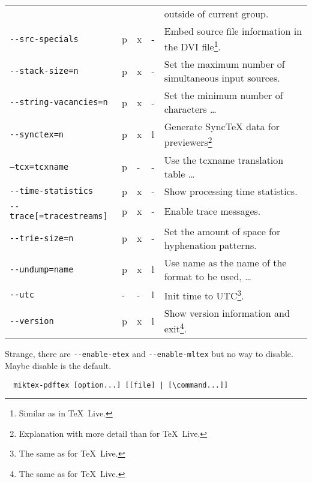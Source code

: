 \documentclass[a4paper, english]{article}%
\newcommand{\pdflatex}{\texttt{pdflatex}}
\newcommand{\texlive}{\TeX~Live}
\begin{document}
{\begin{longtable}{|lllll|}
                                      &  & &        & outside of current group. \\
\texttt{-{}-src-specials}             & p&x&- & Embed source file information in the DVI file\footnote%
{Similar as in \texlive. }. \\
\texttt{-{}-stack-size=n}             & p&x&- & Set the maximum number of simultaneous input sources. \\
\texttt{-{}-string-vacancies=n}       & p&x&- & Set the minimum number of characters \dots \\
\texttt{-{}-synctex=n}                & p&x&l       & Generate SyncTeX data for previewers\footnote%
{Explanation with more detail than for \texlive. } \\
\texttt{--tcx=tcxname}                & p&-&- & Use the tcxname translation table \dots \\
\texttt{-{}-time-statistics}          & p&x&- & Show processing time statistics. \\
\texttt{-{}-trace[=tracestreams]}     & p&x&- & Enable trace messages. \\
\texttt{-{}-trie-size=n}              & p&x&- & Set the amount of space for hyphenation patterns. \\
\texttt{-{}-undump=name}              & p&x&l       & Use name as the name of the format to be used, \dots \\
\texttt{-{}-utc}                      & -&-&l & Init time to UTC\footnote%
   {The same as for \texlive. }.  \\
\texttt{-{}-version}                  & p&x&l       & Show version information and exit\footnote%
{The same as for \texlive. }. \\
\end{longtable}
}

Strange, there are \texttt{-{}-enable-etex} and \texttt{-{}-enable-mltex} 
but no way to disable. 
Maybe disable is the default. 

\begin{verbatim}
  miktex-pdftex [option...] [[file] | [\command...]]
\end{verbatim}

\end{document}
